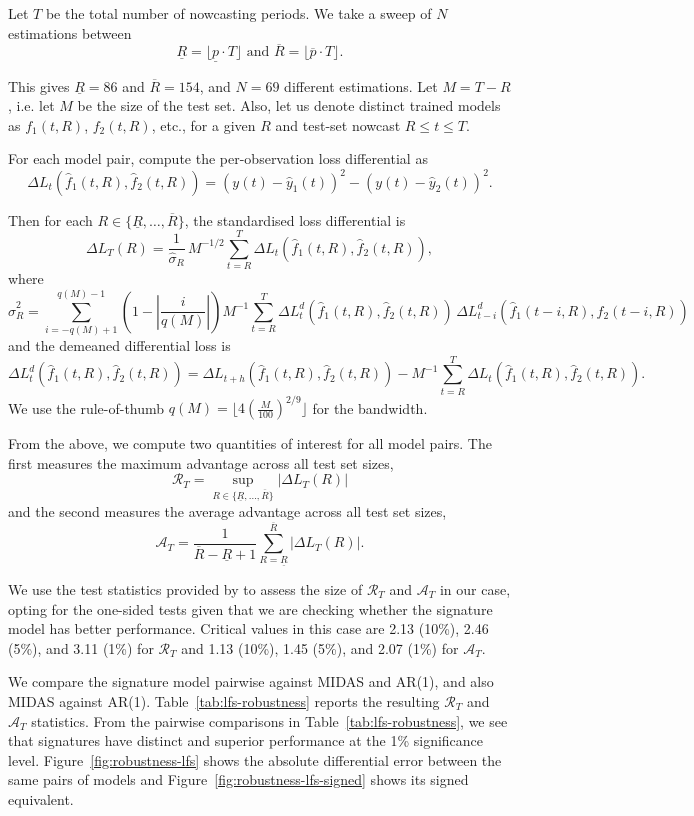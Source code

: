 \documentclass[a4paper, 12pt]{article}
\theoremstyle{remark}
\begin{document}
Let $T$ be the total number of nowcasting periods. We take a sweep of $N$ estimations between
\[
\underline{R} = \lfloor{\underline{p} \cdot T\rfloor} \text{ and } \overline{R}=\lfloor{\overline{p}\cdot T\rfloor}.
\]

This gives $\underline{R} = 86$ and $\overline{R} = 154$, and $N = 69$ different estimations. Let $M=T-R$, i.e. let $M$ be the size of the test set. Also, let us denote distinct trained models as $f_{1}(t, R)$, $f_2(t, R)$, etc., for a given $R$ and test-set nowcast $R \leq t \leq T$.

For each model pair, compute the per-observation loss differential as
\[
\Delta L_{t}(\hat f_1(t, R), \hat f_2(t,R)) = (y(t) - \hat y_{1}(t))^2 - (y(t) - \hat y_2(t))^2.
\]

Then for each $R \in \{\underline{R}, \dots, \overline{R}\}$, the standardised loss differential is
\[
\Delta L_T(R) = \frac{1}{\hat\sigma_R} \, M^{-1/2} \sum_{t=R}^{T} \Delta L_{t}(\hat f_1(t,R), \hat f_2(t,R)),
\]
where
\[
\hat\sigma_R^2 = \sum_{i=-q(M)+1}^{q(M)-1} \left(1 - \left|\frac{i}{q(M)}\right|\right) M^{-1} \sum_{t=R}^{T} \Delta L^d_{t}(\hat f_1(t,R), \hat f_2(t,R)) \, \Delta L^d_{t-i}(\hat f_1(t-i,R), \hat f_2(t-i,R))
\]
and the demeaned differential loss is
\[
\Delta L^d_{t}(\hat f_1(t, R), \hat f_2(t, R)) = \Delta L_{t+h}(\hat f_1(t, R), \hat f_2(t, R)) - M^{-1} \sum_{t=R}^{T} \Delta L_{t}(\hat f_1(t, R), \hat f_2(t, R)).
\]
We use the rule-of-thumb $q(M)=\lfloor{4 \left(\frac{M}{100}\right)^{2/9}\rfloor}$ for the bandwidth.

From the above, we compute two quantities of interest for all model pairs. The first measures the maximum advantage across all test set sizes,
\[
\mathcal{R}_T = \sup_{R \in \{\underline{R}, \ldots, \overline{R}\}} \left| \Delta L_T(R) \right|
\]
and the second measures the average advantage across all test set sizes,
\[
\mathcal{A}_T = \frac{1}{\overline{R} - \underline{R} + 1} \sum_{R = \underline{R}}^{\overline{R}} \left| \Delta L_T(R) \right|.
\]

We use the test statistics provided by \citet{rossi_outofsample_2012} to assess the size of $\mathcal{R}_T$ and $\mathcal{A}_T$ in our case, opting for the one-sided tests given that we are checking whether the signature model has better performance. Critical values in this case are 2.13 (10\%), 2.46 (5\%), and 3.11 (1\%) for $\mathcal{R}_T$ and 1.13 (10\%), 1.45 (5\%), and 2.07 (1\%) for $\mathcal{A}_T$.

We compare the signature model pairwise against MIDAS and AR(1), and also MIDAS against AR(1). Table~\ref{tab:lfs-robustness} reports the resulting $\mathcal{R}_T$ and $\mathcal{A}_T$ statistics. From the pairwise comparisons in Table~\ref{tab:lfs-robustness}, we see that signatures have distinct and superior performance at the 1\% significance level. Figure~\ref{fig:robustness-lfs} shows the absolute differential error between the same pairs of models and Figure~\ref{fig:robustness-lfs-signed} shows its signed equivalent.
\end{document}
